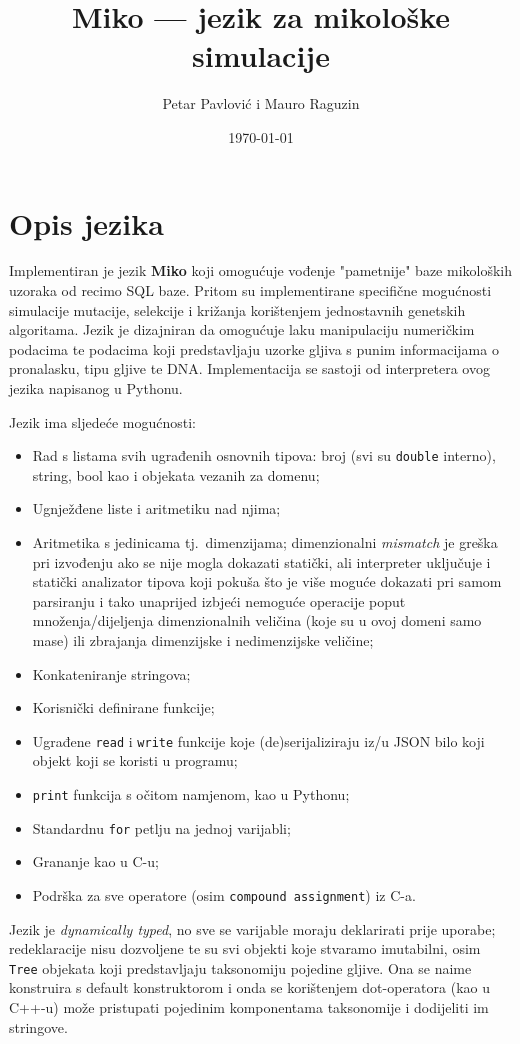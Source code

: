 \documentclass[12pt]{scrartcl}
\title{Miko --- jezik za mikološke simulacije}
\author{Petar Pavlović i Mauro Raguzin}
\date{\today}
\begin{document}
\maketitle
\tableofcontents
\pagebreak

\section{Opis jezika}
Implementiran je jezik \textbf{Miko} koji omogućuje vođenje "pametnije" baze mikoloških uzoraka od recimo SQL baze. Pritom su implementirane specifične
mogućnosti simulacije mutacije, selekcije i križanja korištenjem jednostavnih genetskih algoritama. Jezik je dizajniran da omogućuje laku manipulaciju
numeričkim podacima te podacima koji predstavljaju uzorke gljiva s punim informacijama o pronalasku, tipu gljive te DNA. Implementacija se sastoji
od interpretera ovog jezika napisanog u Pythonu.

Jezik ima sljedeće mogućnosti:
\begin{itemize}
    \item Rad s listama svih ugrađenih osnovnih tipova: broj (svi su \verb|double| interno), string, bool kao i objekata vezanih za domenu;
    \item Ugnježđene liste i aritmetiku nad njima;
    \item Aritmetika s jedinicama tj.\ dimenzijama; dimenzionalni \textsl{mismatch} je greška pri izvođenju ako se nije mogla dokazati statički, ali 
    interpreter uključuje i statički analizator tipova koji pokuša što je više moguće dokazati pri samom parsiranju i tako unaprijed izbjeći nemoguće
    operacije poput množenja/dijeljenja dimenzionalnih veličina (koje su u ovoj domeni samo mase) ili zbrajanja dimenzijske i nedimenzijske veličine;
    \item Konkateniranje stringova;
    \item Korisnički definirane funkcije;
    \item Ugrađene \verb|read| i \verb|write| funkcije koje (de)serijaliziraju iz/u JSON bilo koji objekt koji se koristi u programu;
    \item \verb|print| funkcija s očitom namjenom, kao u Pythonu;
    \item Standardnu \verb|for| petlju na jednoj varijabli;
    \item Grananje kao u C-u;
    \item Podrška za sve operatore (osim \verb|compound assignment|) iz C-a.
\end{itemize}
Jezik je \textsl{dynamically typed}, no sve se varijable moraju deklarirati prije uporabe; redeklaracije nisu dozvoljene te su svi objekti koje stvaramo
imutabilni, osim \verb|Tree| objekata koji predstavljaju taksonomiju pojedine gljive. Ona se naime konstruira s default konstruktorom i onda se
korištenjem dot-operatora (kao u C++-u) može pristupati pojedinim komponentama taksonomije i dodijeliti im stringove.
\end{document}
